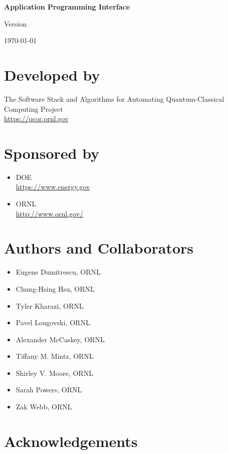 \thispagestyle{empty}
\begin{center}
\textbf{\Huge \qcor}
\par
\end{center}
\begin{center}
\textbf{\LARGE Application Programming Interface}\\
\par
\end{center}

\begin{center}
Version \insertDocVersion
\par
\end{center}

\vspace{0.5in}
\begin{center}
\today
\end{center}

\vspace{0.5in}

\vfill{}

\section*{Developed by}
The Software Stack and Algorithms for Automating Quantum-Classical Computing Project \\
\url{https://qcor.ornl.gov}
\pagebreak{}

\section*{Sponsored by}
\begin{itemize}
\item \ac{DOE}\\
  \url{https://www.energy.gov}
\item \ac{ORNL}\\
  \url{http://www.ornl.gov/} 
\end{itemize}

\section*{Authors and Collaborators}
\begin{itemize}
\item Eugene Dumitrescu, \ac{ORNL}
\item Chung-Hsing Hsu, \ac{ORNL}
\item Tyler Kharazi, \ac{ORNL}
\item Pavel Lougovski, \ac{ORNL}
\item Alexander McCaskey, \ac{ORNL}
\item Tiffany M. Mintz, \ac{ORNL}
\item Shirley V. Moore, \ac{ORNL}
\item Sarah Powers, \ac{ORNL}
\item Zak Webb, \ac{ORNL}
\end{itemize}

\date{\today}

\section*{Acknowledgements}



